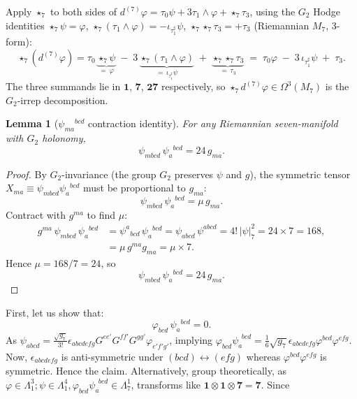 \documentclass[a4paper,11pt,fleqn]{article}
\theoremstyle{plain}
\newtheorem{lemma}[theorem]{Lemma}
\theoremstyle{definition}
\newcommand{\vp}{\varphi}
\newcommand{\ps}{\psi}
\newcommand{\ta}{\tau}
\newcommand{\iot}[1]{\iota_{#1}}
\newcommand{\str}{\star_7}
\begin{document}
Apply $\str$ to both sides of $d^{(7)}\vp = \ta_0\ps+3\ta_1\wedge\vp+\str\ta_3$,
using the $G_2$ Hodge identities
$\str\ps = \vp$, $\str(\ta_1\wedge\vp) = -\iot{\ta_1^\sharp}\ps$,
$\str\str\ta_3 = +\ta_3$ (Riemannian $M_7$, 3-form):
\[
  \str(d^{(7)}\vp)
  = \ta_0\,\underbrace{\str\ps}_{=\,\vp}
    \;-\; 3\,\underbrace{\str(\ta_1\wedge\vp)}_{=\,\iot{\ta_1^\sharp}\ps}
    \;+\; \underbrace{\str\str\ta_3}_{=\,\ta_3}
  \;=\; \ta_0\vp \;-\; 3\,\iot{\ta_1^\sharp}\ps \;+\; \ta_3.
\]
\noindent
The three summands lie in $\mathbf{1}$, $\mathbf{7}$, $\mathbf{27}$ respectively,
so $\str d^{(7)}\vp\in\Omega^3(M_7)$ is the $G_2$-irrep decomposition.


\begin{lemma}[$\ps_{ma}{}^{bcd}$ contraction identity]
\label{lem:psicontract}
For any Riemannian seven-manifold with $G_2$ holonomy, \cite{Karigiannis}
\begin{equation}
\ps_{mbcd}\,\ps_a{}^{bcd} = 24\,g_{ma}.
\label{eq:psipsi}
\end{equation}
\end{lemma}
\begin{proof}
By $G_2$-invariance (the group $G_2$ preserves $\ps$ and $g$), the
symmetric tensor $X_{ma}\equiv\ps_{mbcd}\ps_a{}^{bcd}$ must be
proportional to $g_{ma}$:
\[
  \ps_{mbcd}\,\ps_a{}^{bcd} = \mu\,g_{ma}.
\]
Contract with $g^{ma}$ to find $\mu$:
\begin{align*}
  g^{ma}\,\ps_{mbcd}\,\ps_a{}^{bcd}
  &= \ps^a{}_{bcd}\,\ps_a{}^{bcd}
   = \ps_{abcd}\,\ps^{abcd}
   = 4!\,|\ps|^2_7
   = 24\times 7 = 168,\\
  &= \mu\,g^{ma}g_{ma} = \mu\times 7.
\end{align*}
Hence $\mu = 168/7 = 24$, so
\[
  \ps_{mbcd}\,\ps_a{}^{bcd} = 24\,g_{ma}.
\]
\end{proof}

First, let us show that: 
\begin{equation}
\label{phidotpsi0}
\vp_{bcd}\,\ps_a{}^{bcd} = 0.
\end{equation}
 As $\psi_{abcd} = \frac{\sqrt{g_7}}{3!}\epsilon_{abcdefg}G^{ee'}G^{ff'}G^{gg'}\varphi_{e'f'g'}$, implying $\varphi_{bcd}\psi_a^{\ \ bcd} = \frac{1}{6}\sqrt{g_7}\epsilon_{abcdefg}\varphi^{bcd}\varphi^{efg}$. Now, $\epsilon_{abcdefg}$ is anti-symmetric under $(bcd)\leftrightarrow(efg)$ whereas
$\varphi^{bcd}\varphi^{efg}$ is symmetric. Hence the claim. Alternatively, group theoretically, as $\varphi\in\Lambda^3_1; \psi\in\Lambda^4_1, \varphi_{bcd}\psi_a^{\ \ bcd}\in\Lambda^1_7$, transforms like $\mathbf{1}\otimes\mathbf{1}\otimes\mathbf{7} = \mathbf{7}$. Since 
\end{document}

